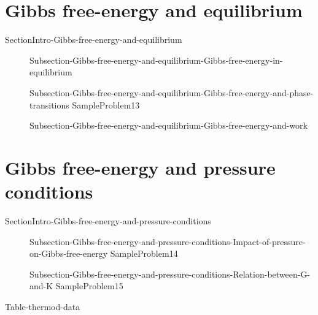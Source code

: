 \documentclass[main.tex]{subfiles}
\begin{document}
\section{Gibbs free-energy and equilibrium}{SectionIntro-Gibbs-free-energy-and-equilibrium}
\sloppy\begin{description}
\item[]{Subsection-Gibbs-free-energy-and-equilibrium-Gibbs-free-energy-in-equilibrium}
\item[]{Subsection-Gibbs-free-energy-and-equilibrium-Gibbs-free-energy-and-phase-transitions}
{SampleProblem13}
 \hspace{-5cm}{Table-Entropy-phase-change}	

\item[] {Subsection-Gibbs-free-energy-and-equilibrium-Gibbs-free-energy-and-work}
\end{description}




\section{Gibbs free-energy and pressure conditions}{SectionIntro-Gibbs-free-energy-and-pressure-conditions}
\sloppy\begin{description}
\item[] {Subsection-Gibbs-free-energy-and-pressure-conditions-Impact-of-pressure-on-Gibbs-free-energy}
{SampleProblem14}
\item[] {Subsection-Gibbs-free-energy-and-pressure-conditions-Relation-between-G-and-K}
{SampleProblem15}
\end{description}





{Table-thermod-data}
\end{document}
